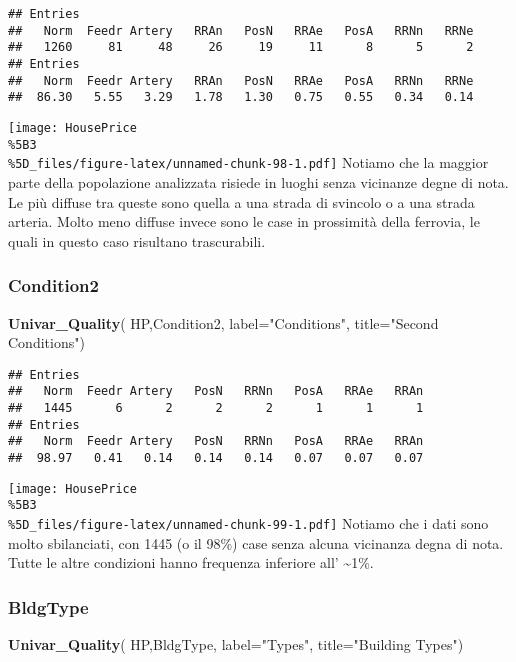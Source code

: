 \documentclass[
]{article}
\newenvironment{Shaded}{\begin{snugshade}}{\end{snugshade}}
\newcommand{\AttributeTok}[1]{\textcolor[rgb]{0.13,0.29,0.53}{#1}}
\newcommand{\FunctionTok}[1]{\textcolor[rgb]{0.13,0.29,0.53}{\textbf{#1}}}
\newcommand{\NormalTok}[1]{#1}
\newcommand{\StringTok}[1]{\textcolor[rgb]{0.31,0.60,0.02}{#1}}
\begin{document}
\begin{verbatim}
## Entries
##   Norm  Feedr Artery   RRAn   PosN   RRAe   PosA   RRNn   RRNe 
##   1260     81     48     26     19     11      8      5      2 
## Entries
##   Norm  Feedr Artery   RRAn   PosN   RRAe   PosA   RRNn   RRNe 
##  86.30   5.55   3.29   1.78   1.30   0.75   0.55   0.34   0.14
\end{verbatim}

\texttt{[image: HousePrice\\\%5B3\\\%5D\_files/figure-latex/unnamed-chunk-98-1.pdf]}
Notiamo che la maggior parte della popolazione analizzata risiede in
luoghi senza vicinanze degne di nota. Le più diffuse tra queste sono
quella a una strada di svincolo o a una strada arteria. Molto meno
diffuse invece sono le case in prossimità della ferrovia, le quali in
questo caso risultano trascurabili.

\subsubsection{Condition2}\label{condition2}

\begin{Shaded}
\begin{Highlighting}[]
\FunctionTok{Univar\_Quality}\NormalTok{(}
\NormalTok{  HP,Condition2,}
  \AttributeTok{label=}\StringTok{"Conditions"}\NormalTok{,}
  \AttributeTok{title=}\StringTok{"Second Conditions"}\NormalTok{)}
\end{Highlighting}
\end{Shaded}

\begin{verbatim}
## Entries
##   Norm  Feedr Artery   PosN   RRNn   PosA   RRAe   RRAn 
##   1445      6      2      2      2      1      1      1 
## Entries
##   Norm  Feedr Artery   PosN   RRNn   PosA   RRAe   RRAn 
##  98.97   0.41   0.14   0.14   0.14   0.07   0.07   0.07
\end{verbatim}

\texttt{[image: HousePrice\\\%5B3\\\%5D\_files/figure-latex/unnamed-chunk-99-1.pdf]}
Notiamo che i dati sono molto sbilanciati, con 1445 (o il 98\%) case
senza alcuna vicinanza degna di nota. Tutte le altre condizioni hanno
frequenza inferiore all' \textasciitilde1\%.

\subsubsection{BldgType}\label{bldgtype}

\begin{Shaded}
\begin{Highlighting}[]
\FunctionTok{Univar\_Quality}\NormalTok{(}
\NormalTok{  HP,BldgType, }
  \AttributeTok{label=}\StringTok{"Types"}\NormalTok{,}
  \AttributeTok{title=}\StringTok{"Building Types"}\NormalTok{)}
\end{Highlighting}
\end{Shaded}
\end{document}
